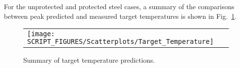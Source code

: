 For the unprotected and protected steel cases, a summary of the comparisons between peak predicted and measured target temperatures is shown in Fig.~\ref{Surface_Temperature_Steel_Summary}.

\begin{figure}[!ht]
\begin{center}
\begin{tabular}{l}
\texttt{[image: SCRIPT\_FIGURES/Scatterplots/Target\_Temperature]}
\end{tabular}
\end{center}
\caption[Summary of target temperature predictions]
{Summary of target temperature predictions.}
\label{Surface_Temperature_Steel_Summary}
\end{figure}

